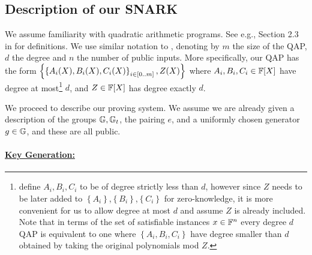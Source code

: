 \documentclass[11pt]{article}
\numberwithin{figure}{section} %
\newcommand{\set}[1]{\ensuremath{\left\{#1\right\}}\xspace}
\begin{document}
\subsection{Description of our SNARK}\label{subsec:SNARK}
We assume familiarity with quadratic arithmetic programs.
See e.g., Section 2.3 in \cite{Groth16} for definitions.
We use similar notation to \cite{BCTV}, denoting by $m$ the size of the QAP, $d$ the degree and $n$ the number of public inputs.
More specifically, our QAP has the form \set{\sett{A_i(X),B_i(X),C_i(X)}{i\in [0..m]}, Z(X)}
where $A_i,B_i,C_i\in \mathbb F[X]$ have degree at most\footnote{\cite{BCTV} define $A_i,B_i,C_i$ to be of degree strictly less than $d$, however since $Z$ needs to be later added to \set{A_i},\set{B_i},\set{C_i} for zero-knowledge, it is more convenient for us to allow degree at most $d$ and assume $Z$ is already included. Note that in terms of the set of satisfiable instances $x\in \mathbb F^n$ every degree $d$ QAP is equivalent to one where \set{A_i,B_i,C_i} have degree smaller than $d$ obtained by taking the original polynomials mod $Z$.} $d$, and $Z\in \mathbb F[X]$ has degree exactly $d$.








We proceed to describe our proving system.
We assume we are already given a description of the groups ${\mathbb G},{\mathbb G}_t$, the pairing $e$, and a uniformly chosen generator 
$g\in {\mathbb G}$, and these are all public.
\paragraph{\underline{Key Generation:}}
\end{document}
